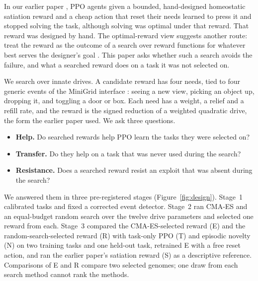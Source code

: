 \documentclass[11pt,letterpaper]{article}
\begin{document}
In our earlier paper \citep{metoyer2026satisfied}, PPO agents given a bounded, hand-designed homeostatic satiation reward
and a cheap action that reset their needs learned to press it and stopped solving the task, although solving was
optimal under that reward. That reward was designed by hand. The optimal-reward view suggests another route:
treat the reward as the outcome of a search over reward functions for whatever best serves the designer's goal
\citep{singh2010intrinsically}. This paper asks whether such a search avoids the failure, and what a searched reward
does on a task it was not selected on.

We search over innate drives. A candidate reward has four needs, tied to four generic events of the MiniGrid
interface \citep{chevalier2023minigrid}: seeing a new view, picking an object up, dropping it, and toggling a door or
box. Each need has a weight, a relief and a refill rate, and the reward is the signed reduction of a weighted
quadratic drive, the form the earlier paper used. We ask three questions.
\begin{itemize}[itemsep=1pt]
  \item \textbf{Help.} Do searched rewards help PPO \citep{schulman2017proximal} learn the tasks they were selected on?
  \item \textbf{Transfer.} Do they help on a task that was never used during the search?
  \item \textbf{Resistance.} Does a searched reward resist an exploit that was absent during the search?
\end{itemize}

We answered them in three pre-registered stages (Figure~\ref{fig:design}). Stage~1 calibrated tasks and fixed a
corrected event detector. Stage~2 ran CMA-ES \citep{hansen2001completely} and an equal-budget random search over the
twelve drive parameters and selected one reward from each. Stage~3 compared the CMA-ES-selected reward (E) and the
random-search-selected reward (R) with task-only PPO (T) and episodic novelty (N) on two training tasks and one
held-out task, retrained E with a free reset action, and ran the earlier paper's satiation reward (S) as a descriptive
reference. Comparisons of E and R compare two selected genomes; one draw from each search method cannot rank the
methods.
\end{document}
